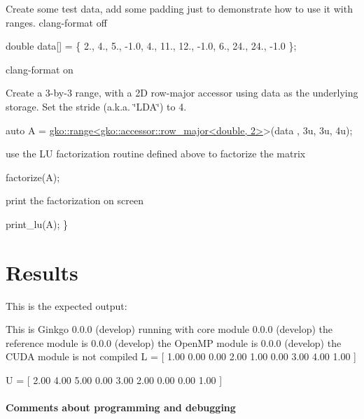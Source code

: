 Create some test data, add some padding just to demonstrate how to use it with ranges. clang-\/format off


\begin{DoxyCode}
\textcolor{keywordtype}{double} data[] = \{
    2.,  4.,  5., -1.0,
    4., 11., 12., -1.0,
    6., 24., 24., -1.0
\};
\end{DoxyCode}


clang-\/format on

Create a 3-\/by-\/3 range, with a 2D row-\/major accessor using data as the underlying storage. Set the stride (a.\+k.\+a. \char`\"{}\+L\+D\+A\char`\"{}) to 4.


\begin{DoxyCode}
\textcolor{keyword}{auto} A = \hyperlink{classgko_1_1range}{gko::range<gko::accessor::row\_major<double, 2>}>(data
      , 3u, 3u, 4u);
\end{DoxyCode}


use the LU factorization routine defined above to factorize the matrix


\begin{DoxyCode}
factorize(A);
\end{DoxyCode}


print the factorization on screen


\begin{DoxyCode}
    print\_lu(A);
\}
\end{DoxyCode}
 \label{_Results}%
\section*{Results}

This is the expected output\+:


\begin{DoxyCode}
This is Ginkgo 0.0.0 (develop)
    running with core module 0.0.0 (develop)
    the reference module is  0.0.0 (develop)
    the OpenMP    module is  0.0.0 (develop)
    the CUDA      module is  not compiled
L = [
  1.00 0.00 0.00 
  2.00 1.00 0.00 
  3.00 4.00 1.00 
]

U = [
  2.00 4.00 5.00 
  0.00 3.00 2.00 
  0.00 0.00 1.00 
]
\end{DoxyCode}


\label{_Commentsaboutprogramminganddebugging}%
\paragraph*{Comments about programming and debugging }

